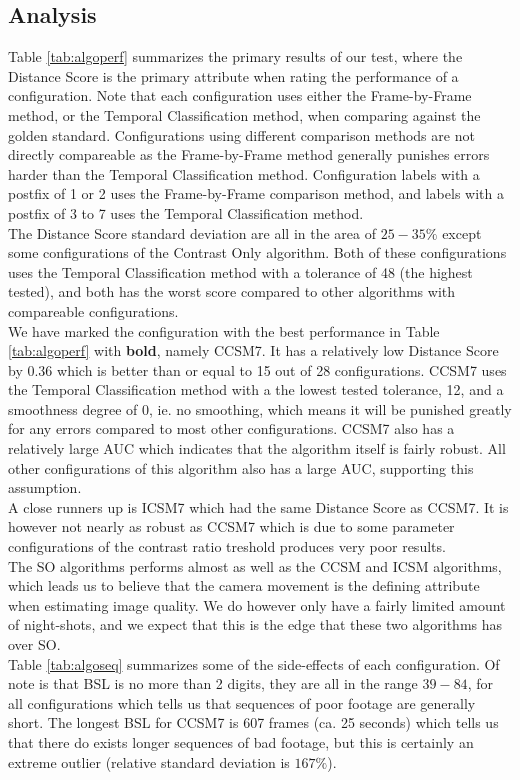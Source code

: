 \subsection{Analysis}
%
Table \ref{tab:algoperf} summarizes the primary results of our test, where the Distance Score is the primary attribute when rating the performance of a configuration. Note that each configuration uses either the Frame-by-Frame method, or the Temporal Classification method, when comparing against the golden standard. Configurations using different comparison methods are not directly compareable as the Frame-by-Frame method generally punishes errors harder than the Temporal Classification method. Configuration labels with a postfix of 1 or 2 uses the Frame-by-Frame comparison method, and labels with a postfix of 3 to 7 uses the Temporal Classification method.\\
The Distance Score standard deviation are all in the area of $25-35\%$ except some configurations of the Contrast Only algorithm. Both of these configurations uses the Temporal Classification method with a tolerance of 48 (the highest tested), and both has the worst score compared to other algorithms with compareable configurations.\\
We have marked the configuration with the best performance in Table \ref{tab:algoperf} with \textbf{bold}, namely CCSM7. It has a relatively low Distance Score by $0.36$ which is better than or equal to 15 out of 28 configurations. CCSM7 uses the Temporal Classification method with a the lowest tested tolerance, 12, and a smoothness degree of 0, ie. no smoothing, which means it will be punished greatly for any errors compared to most other configurations. CCSM7 also has a relatively large AUC which indicates that the algorithm itself is fairly robust. All other configurations of this algorithm also has a large AUC, supporting this assumption.\\
A close runners up is ICSM7 which had the same Distance Score as CCSM7. It is however not nearly as robust as CCSM7 which is due to some parameter configurations of the contrast ratio treshold produces very poor results.\\
The SO algorithms performs almost as well as the CCSM and ICSM algorithms, which leads us to believe that the camera movement is the defining attribute when estimating image quality. We do however only have a fairly limited amount of night-shots, and we expect that this is the edge that these two algorithms has over SO.\\
Table \ref{tab:algoseq} summarizes some of the side-effects of each configuration. Of note is that BSL is no more than 2 digits, they are all in the range $39-84$, for all configurations which tells us that sequences of poor footage are generally short. The longest BSL for CCSM7 is 607 frames (ca. 25 seconds) which tells us that there do exists longer sequences of bad footage, but this is certainly an extreme outlier (relative standard deviation is $167\%$).
